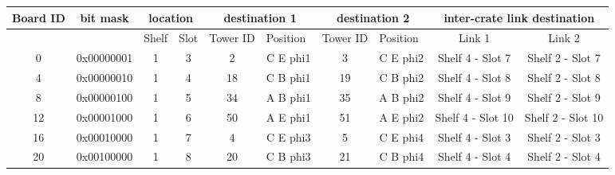 \documentclass[11pt,letterpaper]{article}
\begin{document}
\begin{table}[h]
\tiny
\begin{tabular}{|c|c|c|c|c|c|c|c|c|c|}
\hline
Board ID               & bit mask              & \multicolumn{2}{c|}{location}                          & \multicolumn{2}{c|}{destination 1}                            & \multicolumn{2}{c|}{destination 2}                            & \multicolumn{2}{c|}{inter-crate link destination} \\ \hline
\multicolumn{1}{|l|}{} & \multicolumn{1}{l|}{} & \multicolumn{1}{l|}{Shelf} & \multicolumn{1}{l|}{Slot} & \multicolumn{1}{l|}{Tower ID} & \multicolumn{1}{l|}{Position} & \multicolumn{1}{l|}{Tower ID} & \multicolumn{1}{l|}{Position} & Link 1                  & Link 2                  \\ \hline
0                      & 0x00000001            & 1                          & 3                         & 2                             & C E phi1                      & 3                             & C E phi2                      & Shelf 4 - Slot 7        & Shelf 2 - Slot 7        \\ \hline
4                      & 0x00000010            & 1                          & 4                         & 18                            & C B phi1                      & 19                            & C B phi2                      & Shelf 4 - Slot 8        & Shelf 2 - Slot 8        \\ \hline
8                      & 0x00000100            & 1                          & 5                         & 34                            & A B phi1                      & 35                            & A B phi2                      & Shelf 4 - Slot 9        & Shelf 2 - Slot 9        \\ \hline
12                     & 0x00001000            & 1                          & 6                         & 50                            & A E phi1                      & 51                            & A E phi2                      & Shelf 4 - Slot 10       & Shelf 2 - Slot 10       \\ \hline
16                     & 0x00010000            & 1                          & 7                         & 4                             & C E phi3                      & 5                             & C E phi4                      & Shelf 4 - Slot 3        & Shelf 2 - Slot 3        \\ \hline
20                     & 0x00100000            & 1                          & 8                         & 20                            & C B phi3                      & 21                            & C B phi4                      & Shelf 4 - Slot 4        & Shelf 2 - Slot 4        \\ \hline

\end{tabular}
\end{table}
\end{document}

